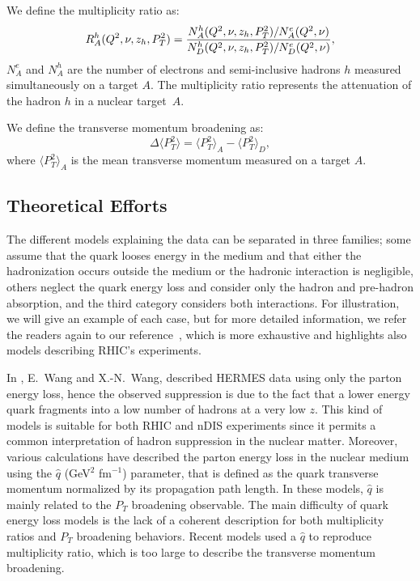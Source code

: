 We define the multiplicity ratio as:
\begin{equation}
R_A^h (Q^2,\nu,z_h,P_T^2) = {{N_A^h (Q^2,\nu,z_h,P_T^2) / N_A^e (Q^2,\nu)} 
                       \over {N_D^h (Q^2,\nu,z_h,P_T^2) / N_D^e (Q^2,\nu)}},
\end{equation}
$N^e_A$ and $N_A^h$ are the number of electrons and semi-inclusive hadrons $h$ measured simultaneously on a target $A$. The multiplicity ratio represents the attenuation of the hadron $h$ in a nuclear target~$A$.
\newline

We define the transverse momentum broadening as:
\begin{equation}
\Delta \langle P_T^2 \rangle = \langle P_T^2 \rangle_A - \langle P_T^2 \rangle_D,
\end{equation}
where $\langle P_T^2 \rangle_A$ is the mean transverse momentum measured on a target $A$.


\subsection{Theoretical Efforts}
\label{sec:theo}

The different models explaining the data can be separated in three families;
some assume that the quark looses energy in the medium and that either the hadronization occurs outside the medium or the hadronic interaction is 
negligible, others neglect the quark energy loss and consider
only the hadron and pre-hadron absorption, and the third category considers both
interactions. For illustration, we will give an example of each case, but for more detailed information, we refer the readers again to our reference~\cite{Accardi:2009qv}, which is more exhaustive and highlights also models describing RHIC's experiments.

In \cite{Wang:2002ri}, E.~Wang and X.-N.~Wang, described HERMES data using only 
the parton energy loss, hence the observed suppression is due to the fact that a lower energy quark fragments into a low number of hadrons at a very low $z$. This kind of models is suitable for both RHIC and nDIS experiments since it permits a common interpretation of hadron suppression in the nuclear matter. Moreover, various calculations have described the parton energy loss in the nuclear medium using the $\hat q$ (GeV$^2$ fm$^{-1}$) parameter, that is defined as the quark transverse momentum normalized by its propagation path length. In these models, $\hat q$ is mainly related to the $P_T$ broadening observable. The main difficulty of quark energy loss models is the lack of a coherent description for both multiplicity ratios and $P_T$ broadening behaviors. Recent models used a $\hat q$ to reproduce multiplicity ratio, which is too large to describe the transverse momentum broadening.

